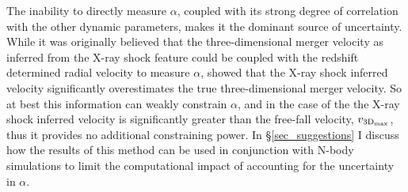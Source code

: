 \documentclass[12pt]{emulateapj}
\begin{document}
The inability to directly measure $\alpha$, coupled with its strong degree of correlation with the other dynamic parameters, makes it the dominant source of uncertainty. 
While it was originally believed that the three-dimensional merger velocity as inferred from the X-ray shock feature could be coupled with the redshift determined radial velocity to measure $\alpha$, \citet{Springel:2007bg} showed that the X-ray shock inferred velocity significantly overestimates the true three-dimensional merger velocity.
So at best this information can weakly constrain $\alpha$, and in the case of the  the X-ray shock inferred velocity is significantly greater than the free-fall velocity, $v_{\rm 3D_{max}}$, thus it provides no additional constraining power.
In \S\ref{sec_suggestions} I discuss how the results of this method can be used in conjunction with N-body simulations to limit the computational impact of accounting for the uncertainty in $\alpha$.
\end{document}
